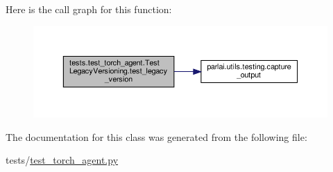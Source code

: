 Here is the call graph for this function\+:
\nopagebreak
\begin{figure}[H]
\begin{center}
\leavevmode
\includegraphics[width=350pt]{classtests_1_1test__torch__agent_1_1TestLegacyVersioning_ab1faa8a34d7089006cfa5746b0ada62f_cgraph}
\end{center}
\end{figure}


The documentation for this class was generated from the following file\+:\begin{DoxyCompactItemize}
\item 
tests/\hyperlink{test__torch__agent_8py}{test\+\_\+torch\+\_\+agent.\+py}\end{DoxyCompactItemize}
